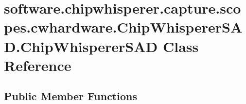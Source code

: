 \hypertarget{classsoftware_1_1chipwhisperer_1_1capture_1_1scopes_1_1cwhardware_1_1ChipWhispererSAD_1_1ChipWhispererSAD}{}\section{software.\+chipwhisperer.\+capture.\+scopes.\+cwhardware.\+Chip\+Whisperer\+S\+A\+D.\+Chip\+Whisperer\+S\+A\+D Class Reference}
\label{classsoftware_1_1chipwhisperer_1_1capture_1_1scopes_1_1cwhardware_1_1ChipWhispererSAD_1_1ChipWhispererSAD}
\subsection*{Public Member Functions}
